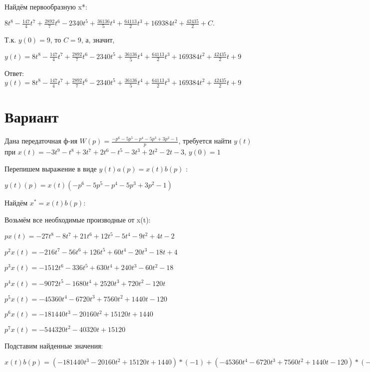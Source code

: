 \documentclass{article}
\begin{document}
{{{{Найдём первообразную x*:

$8t^{8}-\frac{147}{4}t^{7}+\frac{2892}{7}t^{6}-2340t^{5}+\frac{36136}{5}t^{4}+\frac{64113}{2}t^{3}+169384t^{2}+\frac{42435}{2}+C.$

Т.к. $y(0)=9$, то $C=9$, а, значит, 

$y(t)=8t^{8}-\frac{147}{4}t^{7}+\frac{2892}{7}t^{6}-2340t^{5}+\frac{36136}{5}t^{4}+\frac{64113}{2}t^{3}+169384t^{2}+\frac{42435}{2}t+9$

Ответ: $y(t) = 8t^{8}-\frac{147}{4}t^{7}+\frac{2892}{7}t^{6}-2340t^{5}+\frac{36136}{5}t^{4}+\frac{64113}{2}t^{3}+169384t^{2}+\frac{42435}{2}t+9$

\section{Вариант}

Дана передаточная ф-ия $W(p)=\frac{-p^{6}-5p^{5}-p^{4}-5p^{3}+3p^{2}-1}{p}$, требуется найти $y(t)$ при $x(t)=-3t^{9}-t^{8}+3t^{7}+2t^{6}-t^{5}-3t^{3}+2t^{2}-2t-3$, $y(0)=1$

Перепишем выражение в виде $y(t)a(p)=x(t)b(p)$ :

$y(t)(p)=x(t)(-p^{6}-5p^{5}-p^{4}-5p^{3}+3p^{2}-1)$

Найдём $x^*=x(t)b(p)$:

Возьмём все необходимые производные от x(t):

$px(t)=-27t^{8}-8t^{7}+21t^{6}+12t^{5}-5t^{4}-9t^{2}+4t-2$

$p^2x(t)=-216t^{7}-56t^{6}+126t^{5}+60t^{4}-20t^{3}-18t+4$

$p^3x(t)=-1512t^{6}-336t^{5}+630t^{4}+240t^{3}-60t^{2}-18$

$p^4x(t)=-9072t^{5}-1680t^{4}+2520t^{3}+720t^{2}-120t$

$p^5x(t)=-45360t^{4}-6720t^{3}+7560t^{2}+1440t-120$

$p^6x(t)=-181440t^{3}-20160t^{2}+15120t+1440$

$p^7x(t)=-544320t^{2}-40320t+15120$

Подставим найденные значения:

$x(t)b(p) = (-181440t^{3}-20160t^{2}+15120t+1440)*(-1)+(-45360t^{4}-6720t^{3}+7560t^{2}+1440t-120)*(-5)+(-9072t^{5}-1680t^{4}+2520t^{3}+720t^{2}-120t)*(-1)+(-1512t^{6}-336t^{5}+630t^{4}+240t^{3}-60t^{2}-18)*(-5)+(-216t^{7}-56t^{6}+126t^{5}+60t^{4}-20t^{3}-18t+4)*3+(-27t^{8}-8t^{7}+21t^{6}+12t^{5}-5t^{4}-9t^{2}+4t-2)*(-1)=27t^{8}-640t^{7}+7371t^{6}+11118t^{5}+225515t^{4}+211260t^{3}-18051t^{2}-22258t$





}}}}
\end{document}
